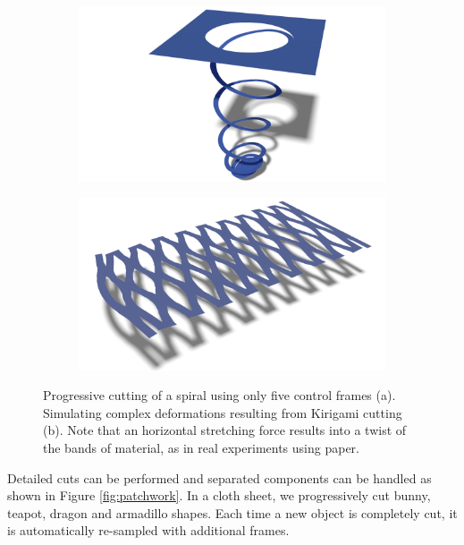 \begin{figure}[!h]
	\centering
	\begin{subfigure}[b]{0.45\linewidth}
		\includegraphics[width=\linewidth]{images/cutting-mig2015/Spiral2.pdf}
		\caption{\label{fig:spiral}}
	\end{subfigure}
	\hfill
	\begin{subfigure}[b]{0.45\linewidth}
		\includegraphics[width=\linewidth]{images/cutting-mig2015/Kirigami.pdf}
		\caption{\label{fig:kirigami}}
	\end{subfigure}
	\caption[Frame-based cutting: Spiral and Kirigami cutting examples]{\label{fig:Cutting_Teaser} Progressive cutting of a spiral using only five control frames (a). Simulating complex deformations resulting from Kirigami cutting (b). Note that an horizontal stretching force results into a twist of the bands of material, as in real experiments using paper.}
\end{figure}

Detailed cuts can be performed and separated components can be handled as shown in Figure \ref{fig:patchwork}. In a cloth sheet, we progressively cut bunny, teapot, dragon and armadillo shapes. Each time a new object is completely cut, it is automatically re-sampled with additional frames.
